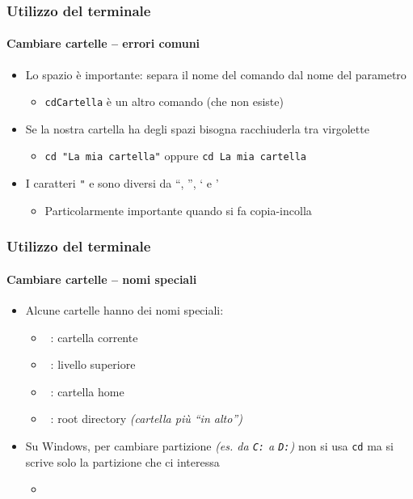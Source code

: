 \begin{exampleframe}
    \frametitle{Utilizzo del terminale}
    \framesubtitle{Cambiare cartelle -- errori comuni}

    \centering
    \bigskip
    
    \begin{itemize}
        \item Lo spazio è importante: separa il nome del comando dal nome del parametro
        \begin{itemize}
            \item \texttt{cdCartella} è un altro comando (che non esiste)
        \end{itemize}
        \bigskip
        
        \item Se la nostra cartella ha degli spazi bisogna racchiuderla tra virgolette
        \begin{itemize}
            \item \texttt{cd "La mia cartella"} oppure \texttt{cd \textquotesingle{}La mia cartella\textquotesingle{}} 
        \end{itemize}
        
        \bigskip
        \item I caratteri \texttt{"} e \texttt{\textquotesingle{}} sono diversi da ``, '', ` e '
        \begin{itemize}
            \item Particolarmente importante quando si fa copia-incolla
        \end{itemize}
    \end{itemize}
\end{exampleframe}

\begin{exampleframe}
    \frametitle{Utilizzo del terminale}
    \framesubtitle{Cambiare cartelle -- nomi speciali}

    
    \begin{itemize}
        \item Alcune cartelle hanno dei nomi speciali:
        \begin{itemize}
            \item {}~: cartella corrente
            \item {}~: livello superiore
            \item {}~: cartella home
            \item {}~: root directory \textit{(cartella più ``in alto'')}
        \end{itemize}
        \bigskip

        \item Su Windows, per cambiare partizione \textit{(es. da \texttt{C:} a \texttt{D:})} non si usa \texttt{cd} ma si scrive solo la partizione che ci interessa
        \begin{itemize}
            \item {}
        \end{itemize}
    \end{itemize}
\end{exampleframe}

